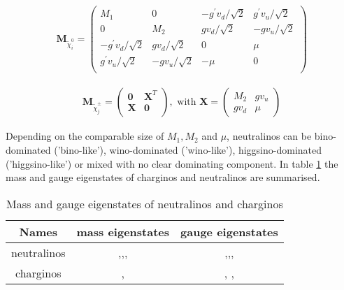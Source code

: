 \begin{align}
\textbf{M}_{\tilde{\chi}_i^0} = \begin{pmatrix}
M_1 & 0 & -g^\prime v_d / \sqrt{2} & g^\prime v_u/\sqrt{2} \\
0 & M_2 & g v_d / \sqrt{2} & -g v_u / \sqrt{2}\\
-g^\prime v_d / \sqrt{2}  & g v_d / \sqrt{2} & 0 & \mu \\
g^\prime v_u/\sqrt{2} & -g v_u / \sqrt{2} & -\mu & 0 \\
\end{pmatrix} \label{eq:theo:Mneutralino}
\end{align}

\begin{align}
\textbf{M}_{\tilde{\chi}_j^\pm} = \begin{pmatrix}
\textbf{0} & \textbf{X}^T\\
\textbf{X} & \textbf{0} \\
\end{pmatrix}, \text{ with } \textbf{X} = \begin{pmatrix} M_2 & gv_u \\
gv_d & \mu 
\end{pmatrix}
\label{eq:theo:Mchargino}
\end{align}

Depending on the comparable size of $M_1, M_2$ and $\mu$, neutralinos can be bino-dominated ('bino-like'), wino-dominated ('wino-like'), higgsino-dominated ('higgsino-like') or mixed with no clear dominating component. In table \ref{tab:theory:gaugeeigenstates} the mass and gauge eigenstates of charginos and neutralinos are summarised.
\begin{table}[h]
	\centering
	\begin{tabular}{|c|c|c|}\hline
		Names & mass eigenstates & gauge eigenstates \\ \hline \hline
		neutralinos & \None,\Ntwo,\Nthree,\Nfour &  \Bino,\WinoZero,\HiggsinoUpZero,\HiggsinoDownZero\\ \hline
		charginos & \Cone, \Ctwo & \Winoplusminus, \HiggsinoUpPlus,\HiggsinoDownMinus \\ \hline
	\end{tabular}
	\caption{Mass and gauge eigenstates of neutralinos and charginos \label{tab:theory:gaugeeigenstates}}
\end{table}

